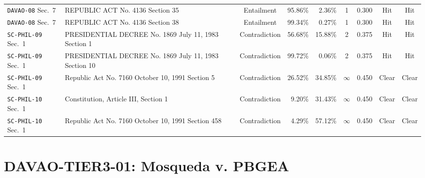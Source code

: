 \begin{landscape}
\begin{table}[p]
\begin{tabularx}{\linewidth}{@{} >{\RaggedRight\arraybackslash}p{2.9cm} >{\RaggedRight\arraybackslash}X c r r c c c c @{}}
        \texttt{DAVAO-08} Sec.~7 & REPUBLIC ACT No. 4136 Section 35 & Entailment & 95.86\% & 2.36\% & 1 & 0.300 & Hit & Hit \\
        \texttt{DAVAO-08} Sec.~7 & REPUBLIC ACT No. 4136 Section 38 & Entailment & 99.34\% & 0.27\% & 1 & 0.300 & Hit & Hit \\
        \texttt{SC-PHIL-09} Sec.~1 & PRESIDENTIAL DECREE No. 1869 July 11, 1983 Section 1 & Contradiction & 56.68\% & 15.88\% & 2 & 0.375 & Hit & Hit \\
        \texttt{SC-PHIL-09} Sec.~1 & PRESIDENTIAL DECREE No. 1869 July 11, 1983 Section 10 & Contradiction & 99.72\% & 0.06\% & 2 & 0.375 & Hit & Hit \\
        \texttt{SC-PHIL-09} Sec.~1 & Republic Act No. 7160 October 10, 1991 Section 5 & Contradiction & 26.52\% & 34.85\% & $\infty$ & 0.450 & Clear & Clear \\
        \texttt{SC-PHIL-10} Sec.~1 & 1987 Constitution, Article III, Section 1 & Contradiction & 9.20\% & 31.43\% & $\infty$ & 0.450 & Clear & Clear \\
        \texttt{SC-PHIL-10} Sec.~1 & Republic Act No. 7160 October 10, 1991 Section 458 & Contradiction & 4.29\% & 57.12\% & $\infty$ & 0.450 & Clear & Clear \\
        \bottomrule
    \end{tabularx}
\end{table}
\end{landscape}
\clearpage

\section{DAVAO-TIER3-01: Mosqueda v. PBGEA}
\label{sec:tab_app_tier3_01}

